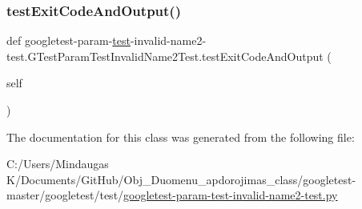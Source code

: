 \subsubsection{\texorpdfstring{testExitCodeAndOutput()}{testExitCodeAndOutput()}}
{\footnotesize\ttfamily def googletest-\/param-\/\mbox{\hyperlink{_mutual_8h_a707ee03719e99670bf6cfdfd897b8456}{test}}-\/invalid-\/name2-\/test.\+G\+Test\+Param\+Test\+Invalid\+Name2\+Test.\+test\+Exit\+Code\+And\+Output (\begin{DoxyParamCaption}\item[{}]{self }\end{DoxyParamCaption})}



The documentation for this class was generated from the following file\+:\begin{DoxyCompactItemize}
\item 
C\+:/\+Users/\+Mindaugas K/\+Documents/\+Git\+Hub/\+Obj\+\_\+\+Duomenu\+\_\+apdorojimas\+\_\+class/googletest-\/master/googletest/test/\mbox{\hyperlink{googletest-master_2googletest_2test_2googletest-param-test-invalid-name2-test_8py}{googletest-\/param-\/test-\/invalid-\/name2-\/test.\+py}}\end{DoxyCompactItemize}
